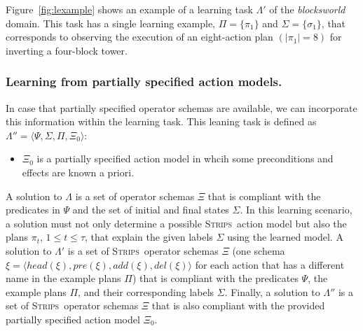 \documentclass[letterpaper]{article} %
\newcommand{\tup}[1]{{\langle #1 \rangle}}
\newcommand{\strips}{\textsc{Strips}}     %
\begin{document}
Figure~\ref{fig:lexample} shows an example of a learning task $\Lambda'$ of the {\em blocksworld} domain. This task has a single learning example, $\Pi=\{\pi_1\}$ and $\Sigma=\{\sigma_1\}$, that corresponds to observing the execution of an eight-action plan $(|\pi_1|=8)$ for inverting a four-block tower.

\subsubsection{Learning from partially specified action models.}
In case that partially specified operator schemas are available, we can incorporate this information within the learning task. This leaning task is defined as $\Lambda''=\tup{\Psi,\Sigma,\Pi,\Xi_0}$:

\begin{itemize}
\item $\Xi_0$ is a partially specified action model in whcih some preconditions and effects are known a priori.
\end{itemize}

A solution to $\Lambda$ is a set of operator schemas $\Xi$ that is compliant with the predicates in $\Psi$ and the set of initial and final states $\Sigma$. In this learning scenario, a solution must not only determine a possible \strips\ action model but also the plans $\pi_t$, {\tt\small $1\leq t\leq \tau$}, that explain the given labels $\Sigma$ using the learned model. A solution to $\Lambda'$ is a set of \strips\ operator schemas $\Xi$ (one schema $\xi=\tup{head(\xi),pre(\xi),add(\xi),del(\xi)}$ for each action that has a different name in the example plans $\Pi$) that is compliant with the predicates $\Psi$, the example plans $\Pi$, and their corresponding labels $\Sigma$.  Finally, a solution to $\Lambda''$ is a set of \strips\ operator schemas $\Xi$ that is also compliant with the provided partially specified action model $\Xi_0$.
\end{document}
